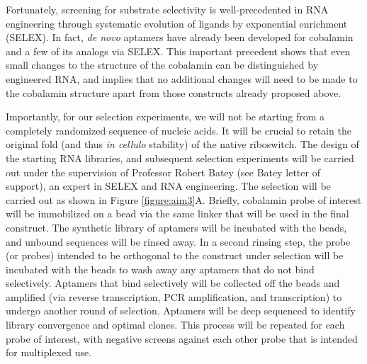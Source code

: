 Fortunately, screening for substrate selectivity is well-precedented in RNA engineering through systematic evolution of ligands by exponential enrichment (SELEX).\cite{MairalAptamersmoleculartools2008,ChoApplicationsAptamersSensors2009} In fact, \textit{de novo} aptamers have already been developed for cobalamin and a few of its analogs via SELEX.\cite{LorschvitroselectionRNA1994} This important precedent shows that even small changes to the structure of the cobalamin can be distinguished by engineered RNA, and implies that no additional changes will need to be made to the cobalamin structure apart from those constructs already proposed above.

Importantly, for our selection experiments, we will not be starting from a completely randomized sequence of nucleic acids. It will be crucial to retain the original fold (and thus \textit{in cellulo} stability) of the native riboswitch. The design of the starting RNA libraries, and subsequent selection experiments will be carried out under the supervision of Professor Robert Batey (see Batey letter of support), an expert in SELEX and RNA engineering.\cite{TrauschChapterThreeDesign2015} The selection will be carried out as shown in Figure \ref{figure:aim3}A. Briefly, cobalamin probe of interest will be immobilized on a bead via the same linker that will be used in the final construct. The synthetic library of aptamers will be incubated with the beads, and unbound sequences will be rinsed away. In a second rinsing step, the probe (or probes) intended to be orthogonal to the construct under selection will be incubated with the beads to wash away any aptamers that do not bind selectively. 
Aptamers that bind selectively will be collected off the beads and amplified (via reverse transcription, PCR amplification, and transcription) to undergo another round of selection. Aptamers will be deep sequenced to identify library convergence and optimal clones. This process will be repeated for each probe of interest, with negative screens against each other probe that is intended for multiplexed use.

